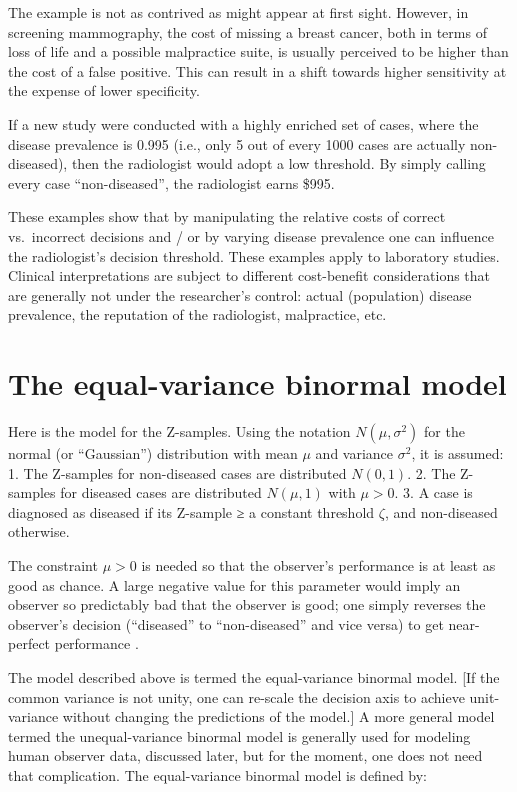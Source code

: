 \documentclass[
]{book}
\begin{document}
The example is not as contrived as might appear at first sight. However, in screening mammography, the cost of missing a breast cancer, both in terms of loss of life and a possible malpractice suite, is usually perceived to be higher than the cost of a false positive. This can result in a shift towards higher sensitivity at the expense of lower specificity.

If a new study were conducted with a highly enriched set of cases, where the disease prevalence is 0.995 (i.e., only 5 out of every 1000 cases are actually non-diseased), then the radiologist would adopt a low threshold. By simply calling every case ``non-diseased'', the radiologist earns \$995.

These examples show that by manipulating the relative costs of correct vs.~incorrect decisions and / or by varying disease prevalence one can influence the radiologist's decision threshold. These examples apply to laboratory studies. Clinical interpretations are subject to different cost-benefit considerations that are generally not under the researcher's control: actual (population) disease prevalence, the reputation of the radiologist, malpractice, etc.

\hypertarget{the-equal-variance-binormal-model}{%
\section{The equal-variance binormal model}\label{the-equal-variance-binormal-model}}

Here is the model for the Z-samples. Using the notation \(N(\mu,\sigma^2)\) for the normal (or ``Gaussian'') distribution with mean \(\mu\) and variance \(\sigma^2\), it is assumed:
1. The Z-samples for non-diseased cases are distributed \(N(0,1)\).
2. The Z-samples for diseased cases are distributed \(N(\mu,1)\) with \(\mu>0\).
3. A case is diagnosed as diseased if its Z-sample ≥ a constant threshold \(\zeta\), and non-diseased otherwise.

The constraint \(\mu>0\) is needed so that the observer's performance is at least as good as chance. A large negative value for this parameter would imply an observer so predictably bad that the observer is good; one simply reverses the observer's decision (``diseased'' to ``non-diseased'' and vice versa) to get near-perfect performance .

The model described above is termed the equal-variance binormal model. {[}If the common variance is not unity, one can re-scale the decision axis to achieve unit-variance without changing the predictions of the model.{]} A more general model termed the unequal-variance binormal model is generally used for modeling human observer data, discussed later, but for the moment, one does not need that complication. The equal-variance binormal model is defined by:
\end{document}
